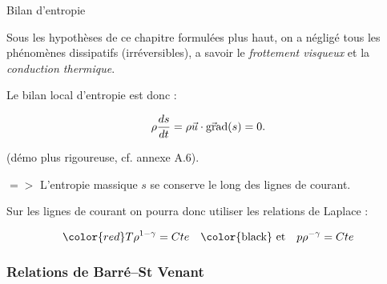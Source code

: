 \begin{frame}{Bilan d'entropie}

\small
Sous les hypothèses de ce chapitre formulées plus haut, on a négligé tous les phénomènes dissipatifs (irréversibles), a savoir le {\em frottement visqueux} et la {\em conduction thermique}.

\medskip
\pause 

Le bilan local d'entropie est donc :


\medskip 
$$
\rho \frac{ds}{dt} =  \rho \vec{u} \cdot \vec{\mbox{\rm gra}}\mbox{\rm d} (s) = 0.
$$

(démo plus rigoureuse, cf. annexe A.6).
\pause
\bigskip

$=>$ L'entropie massique $s$ se conserve le long des lignes de courant.

\pause
\medskip
Sur les lignes de courant on pourra donc utiliser les relations de Laplace :

\[
	\color{red} 
	T\rho^{1-\gamma} = Cte \quad \mbox{\color{black} et} \quad p\rho^{-\gamma} = Cte
\]



\end{frame}

\subsubsection{Relations de Barré--St Venant}


